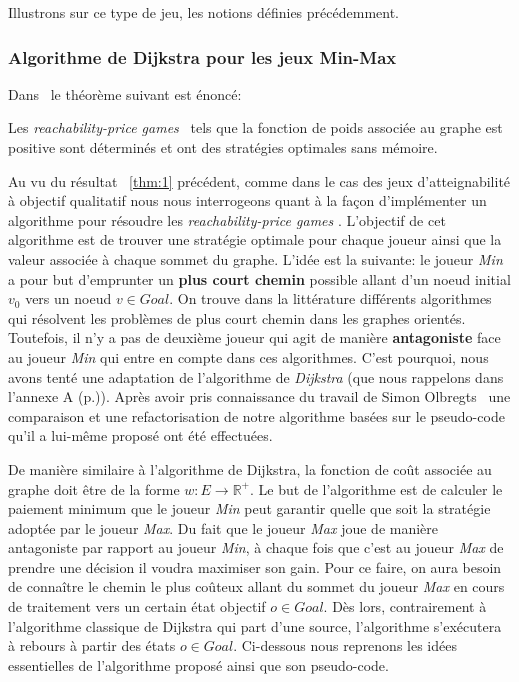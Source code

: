 Illustrons sur ce type de jeu, les notions définies précédemment.


\subsubsection{Algorithme de Dijkstra pour les jeux Min-Max}

Dans~\cite{DBLP:conf/lfcs/BrihayePS13} le théorème suivant est énoncé:

\begin{thm}
	\label{thm:1}
	Les \og\textit{reachability-price games}\fg~ tels que la fonction de poids associée au graphe est positive sont déterminés et ont des stratégies optimales sans mémoire.
\end{thm}


Au vu du résultat ~\ref{thm:1} précédent, comme dans le cas des jeux d'atteignabilité à objectif qualitatif nous nous interrogeons quant à la façon d'implémenter un algorithme pour résoudre les \og \textit{reachability-price games} \fg. L'objectif de cet algorithme est de trouver une stratégie optimale pour chaque joueur ainsi que la valeur associée à chaque sommet du graphe. L'idée est la suivante: le joueur \textit{Min} a pour but d'emprunter un \textbf{plus court chemin} possible allant d'un noeud initial $v_{0}$ vers un noeud $v \in Goal$. On trouve dans la littérature différents algorithmes qui résolvent les problèmes de plus court chemin dans les graphes orientés. Toutefois, il n'y a pas de deuxième joueur qui agit de manière \textbf{antagoniste} face au joueur \textit{Min} qui entre en compte dans ces algorithmes. C'est pourquoi, nous avons tenté une adaptation de l'algorithme de \textit{Dijkstra} (que nous rappelons dans l'annexe A (p.\pageref{algo:dijkstra})). Après avoir pris connaissance du travail de Simon Olbregts~\cite{simon} une comparaison et une refactorisation de notre algorithme basées sur le pseudo-code qu'il a lui-même proposé ont été effectuées.

De manière similaire à l'algorithme de Dijkstra, la fonction de coût associée au graphe doit être de la forme $w : E \rightarrow \mathbb{R}^{+}$. Le but de l'algorithme est de calculer le paiement minimum que le joueur \textit{Min} peut garantir quelle que soit la stratégie adoptée par le joueur \textit{Max}. Du fait que le joueur \textit{Max} joue de manière antagoniste par rapport au joueur \textit{Min}, à chaque fois que c'est au joueur \textit{Max} de prendre une décision il voudra maximiser son gain. Pour ce faire, on aura besoin de connaître le chemin le plus coûteux allant du sommet du joueur \textit{Max} en cours de traitement vers un certain état objectif $o \in Goal$. Dès lors, contrairement à l'algorithme classique de Dijkstra qui part d'une source, l'algorithme s'exécutera à rebours à partir des états $o \in Goal$. Ci-dessous nous reprenons les idées essentielles de l'algorithme proposé ainsi que son pseudo-code.\\

